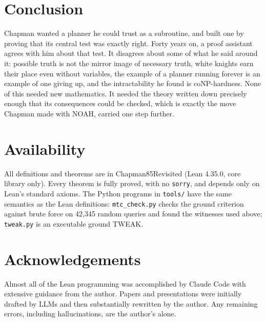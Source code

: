 \documentclass[11pt]{article}
\newcommand{\code}[1]{\texttt{#1}}
\begin{document}
\section{Conclusion}

Chapman wanted a planner he could trust as a subroutine, and built one by
proving that its central test was exactly right. Forty years on, a proof
assistant agrees with him about that test. It disagrees about some of what
he said around it: possible truth is not the mirror image of necessary
truth, white knights earn their place even without variables, the example
of a planner running forever is an example of one giving up, and the
intractability he found is coNP-hardness. None of this needed new
mathematics. It needed the theory written down precisely enough that its
consequences could be checked, which is exactly the move Chapman made with
NOAH, carried one step further.

\section*{Availability}

All definitions and theorems are in Chapman85Revisited
\citep{chapman85revisited} (Lean 4.35.0, core library only). Every theorem
is fully proved, with no \code{sorry}, and depends only on Lean's standard
axioms. The Python programs in \code{tools/} have the same semantics as the
Lean definitions: \code{mtc\_check.py} checks the ground criterion against
brute force on 42,345 random queries and found the witnesses used above;
\code{tweak.py} is an executable ground TWEAK.

\section*{Acknowledgements}

Almost all of the Lean programming was accomplished by Claude Code with
extensive guidance from the author. Papers and presentations were
initially drafted by LLMs and then substantially rewritten by the author.
Any remaining errors, including hallucinations, are the author's alone.



\end{document}

